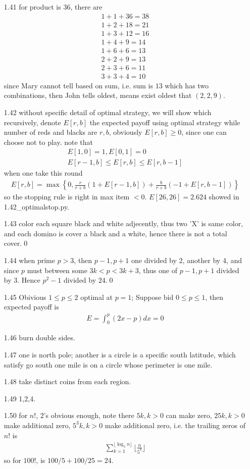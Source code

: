 \documentclass[paper=a4, fontsize=11pt]{scrartcl} %
\numberwithin{equation}{section} %
\numberwithin{figure}{section} %
\numberwithin{table}{section} %
\begin{document}
\begin{itemize}
	\item[1.41] for product is 36, there are 
	\begin{align}
		1+1+36=38\\
		1+2+18=21\\
		1+3+12=16\\
		1+4+9=14\\
		1+6+6=13\\
		2+2+9=13\\
		2+3+6=11\\
		3+3+4=10
	\end{align}
	since Mary cannot tell based on sum, i.e. sum is $13$ which has two combinations, then John tells oldest, means exist oldest that $(2,2,9)$.
	\item[1.42] without specific detail of optimal strategy, we will show which recursively, denote $E[r,b]$ the expected payoff using optimal strategy while number of reds and blacks are $r,b$, obviously $E[r,b]\geq 0$, since one can choose not to play. note that
	\begin{align}
		E[1,0]=1, E[0,1]=0\\
		E[r-1,b]\leq E[r,b]\leq E[r,b-1]
	\end{align}	
	when one take this round
	\begin{align}
		E[r,b] = \max\left\{0, \frac{r}{r+b}\left(1+E[r-1,b]\right) + \frac{b}{r+b}\left(-1+E[r,b-1]\right)\right\}
	\end{align}
	so the stopping rule is right in max item $<0$. $E[26,26]= 2.624$ showed in 1.42\_optimalstop.py.
	\item[1.43] color each square black and white adjecently, thus two 'X' is same color, and each domino is cover a black and a white, hence there is not a total cover.\qed
	\item[1.44] when prime $p>3$, then $p-1,p+1$ one divided by 2, another by 4, and since $p$ must between some $3k<p<3k+3$, thus one of $p-1,p+1$ divided by 3. Hence $p^2-1$ divided by $24$.\qed
	\item[1.45] Obivious $1\leq p\leq 2$ optimal at $p=1$; Suppose bid $0\leq p\leq 1$, then expected payoff is
	\begin{align}
		E = \int_0^p (2x-p) dx =  0
	\end{align}
	\item[1.46] burn double sides.
	\item[1.47] one is north pole; another is a circle is a specific south latitude, which satisfy go south one mile is on a circle whose perimeter is one mile.
	\item[1.48] take distinct coins from each region.
	\item[1.49] 1,2,4.
	\item[1.50] for $n!$, $2$'s obvious enough, note there $5k,k>0$ can make zero, $25k,k>0$ make additional zero, $5^3k,k>0$ make additional zero, i.e. the trailing zeros of $n!$ is
	\begin{align}
		\sum_{k=1}^{\lfloor \log_5 n \rfloor} \lfloor \frac{n}{5^k}\rfloor
	\end{align}
	so for $100!$, is $100/5 + 100/25= 24$.
\end{itemize}
\end{document}
